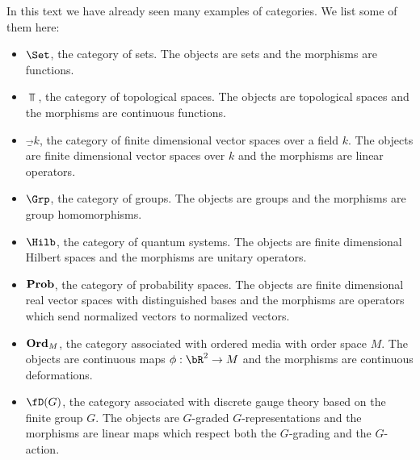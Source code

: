 \begin{ex}\label{category-examples} In this text we have already seen many examples of categories. We list some of them here:

\begin{itemize}
\item $\Set$, the category of sets. The objects are sets and the morphisms are functions.

\item $\Top$, the category of topological spaces. The objects are topological spaces and the morphisms are continuous functions.

\item $\Vec_k$, the category of finite dimensional vector spaces over a field $k$. The objects are finite dimensional vector spaces over $k$ and the morphisms are linear operators.

\item $\Grp$, the category of groups. The objects are groups and the morphisms are group homomorphisms.

\item $\Hilb$, the category of quantum systems. The objects are finite dimensional Hilbert spaces and the morphisms are unitary operators.

\item ${\bf Prob}$, the category of probability spaces. The objects are finite dimensional real vector spaces with distinguished bases and the morphisms are operators which send normalized vectors to normalized vectors.

\item ${\bf Ord}_M$, the category associated with ordered media with order space $M$. The objects are continuous maps $\phi: \bR^2\to M$ and the morphisms are continuous deformations.

\item $\fD(G)$, the category associated with discrete gauge theory based on the finite group $G$. The objects are $G$-graded $G$-representations and the morphisms are linear maps which respect both the $G$-grading and the $G$-action.

\end{itemize}
\end{ex}

